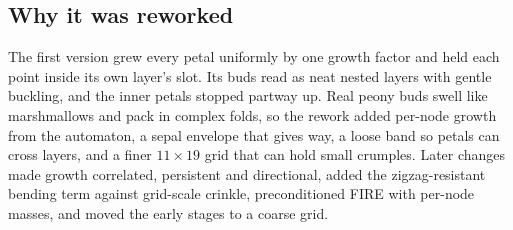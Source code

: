 \subsection{Why it was reworked}\label{sec:packing-limits}
The first version grew every petal uniformly by one growth factor and held
each point inside its own layer's slot. Its buds read as neat nested layers
with gentle buckling, and the inner petals stopped partway up. Real peony buds
swell like marshmallows and pack in complex folds, so the rework added
per-node growth from the automaton, a sepal envelope that gives way, a loose
band so petals can cross layers, and a finer $11\times19$ grid that can hold
small crumples. Later changes made growth correlated, persistent and
directional, added the zigzag-resistant bending term against grid-scale
crinkle, preconditioned FIRE with per-node masses, and moved the early stages
to a coarse grid.
